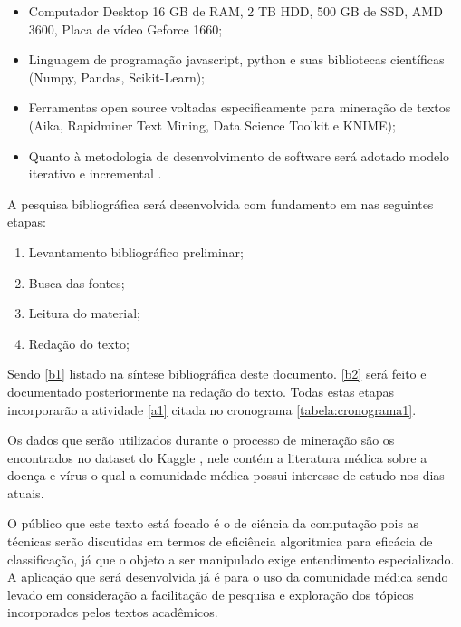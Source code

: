 \documentclass[
	12pt,				%
	a4paper,			%
	english,			%
	brazil,				%
	]{article}
\begin{document}
    \begin{itemize}
        \item Computador Desktop 16 GB de RAM, 2 TB HDD, 500 GB de SSD, AMD 3600, Placa de v\' ideo Geforce 1660;
        \item Linguagem de programa\c c\~ ao javascript, python e suas bibliotecas cient\' ificas (Numpy, Pandas, Scikit-Learn);
        \item Ferramentas open source voltadas especificamente para minera\c c\~ ao de textos (Aika, Rapidminer Text Mining, Data Science Toolkit e KNIME);
        \item Quanto à metodologia de desenvolvimento de software ser\' a adotado modelo iterativo e incremental \cite{pressman2016engenharia}.
    \end{itemize}

   A pesquisa bibliogr\' afica ser\' a desenvolvida com fundamento em \cite{lakatos2001metodologia} nas seguintes etapas:
   \begin{enumerate}
        \item Levantamento bibliogr\' afico preliminar; \label{b1}
        \item Busca das fontes; \label{b2}
        \item Leitura do material; \label{b3}
        \item Reda\c c\~ ao do texto; \label{b4}
   \end{enumerate}
   
   Sendo \ref{b1} listado na síntese bibliogr\' afica deste documento. \ref{b2} ser\' a feito e documentado posteriormente na reda\c c\~ ao do texto. Todas estas etapas incorporar\~ ao a atividade \ref{a1} citada no cronograma \ref{tabela:cronograma1}.

    Os dados que ser\~ ao utilizados durante o processo de minera\c c\~ ao s\~ ao os encontrados no dataset do Kaggle \cite{kaggle20online}, nele contém a literatura médica sobre a doen\c ca e vírus o qual a comunidade médica possui interesse de estudo nos dias atuais.

    O público que este texto est\' a focado é o de ciência da computa\c c\~ ao pois as técnicas ser\~ ao discutidas em termos de eficiência algoritmica para efic\' acia de classifica\c c\~ ao, j\' a que o objeto a ser manipulado exige entendimento especializado. A aplica\c c\~ ao que ser\' a desenvolvida j\' a é para o uso da comunidade médica sendo levado em considera\c c\~ ao a facilita\c c\~ ao de pesquisa e explora\c c\~ ao dos tópicos incorporados pelos textos acadêmicos.
\end{document}
